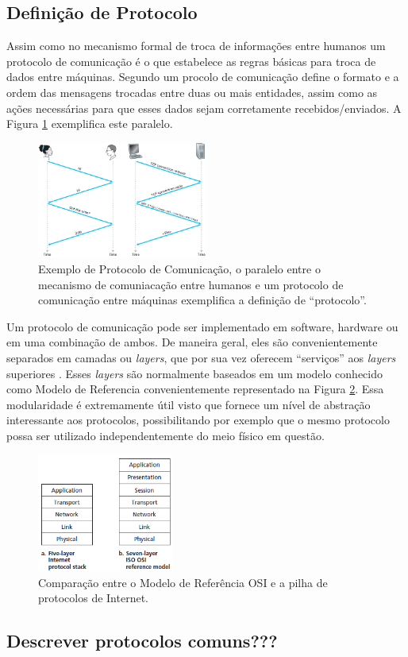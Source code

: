 \subsection{Definição de Protocolo}
Assim como no mecanismo formal de troca de informações entre humanos um protocolo de comunicação é o que estabelece as regras básicas para troca de dados entre máquinas. Segundo \cite{Book-Kurose2013} um procolo de comunicação define o formato e a ordem das mensagens trocadas entre duas ou mais entidades, assim como as ações necessárias para que esses dados sejam corretamente recebidos/enviados. A Figura \ref{fig_explicacao_protocolo} exemplifica este paralelo.

\begin{figure}[!htb]
	\centering
	\includegraphics[width=0.5\textwidth]{./figuras/Explicacao-Protocolo.png} %
	\caption[Exemplo de Protocolo de Comunicação]{Exemplo de Protocolo de Comunicação, o paralelo entre o mecanismo de comuniacação entre humanos e um protocolo de comunicação entre máquinas exemplifica a definição de ``protocolo''.}
	\label{fig_explicacao_protocolo}
\end{figure}

Um protocolo de comunicação pode ser implementado em software, hardware ou em uma combinação de ambos. De maneira geral, eles são convenientemente separados em camadas ou \emph{layers}, que por sua vez oferecem ``serviços'' aos \emph{layers} superiores \cite{Book-Kurose2013}. Esses \emph{layers} são normalmente baseados em um modelo conhecido como Modelo de Referencia  convenientemente representado na Figura \ref{fig_modelo_OSI}. Essa modularidade é extremamente útil visto que fornece um nível de abstração interessante aos protocolos, possibilitando por exemplo que o mesmo protocolo possa ser utilizado independentemente do meio físico em questão.

\begin{figure}[!htb]
	\centering
	\includegraphics[width=0.4\textwidth]{./figuras/Modelo-OSI.png} %
	\caption[Modelo OSI]{Comparação entre o Modelo de Referência OSI e a pilha de protocolos de Internet.}
	\label{fig_modelo_OSI}
\end{figure}

\subsection{Descrever protocolos comuns???}
